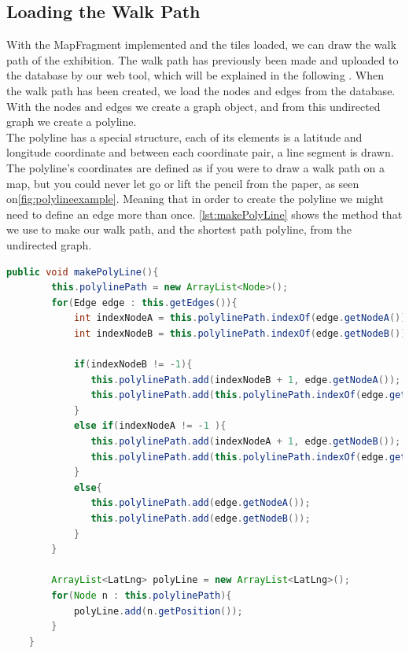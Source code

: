 \subsection*{Loading the Walk Path}
With the MapFragment implemented and the tiles loaded, we can draw the walk path of the exhibition. The walk path has previously been made and uploaded to the database by our web tool, which will be explained in the following . When the walk path has been created, we load the nodes and edges from the database. With the nodes and edges we create a graph object, and from this undirected graph we create a polyline.\\ 
The polyline has a special structure, each of its elements is a latitude and longitude coordinate and between each coordinate pair, a line segment is drawn. The polyline's coordinates are defined as if you were to draw a walk path on a map, but you could never let go or lift the pencil from the paper, as seen on\autoref{fig:polylineexample}. Meaning that in order to create the polyline we might need to define an edge more than once. \autoref{lst:makePolyLine} shows the method that we use to make our walk path, and the shortest path polyline, from the undirected graph.
\begin{lstlisting}[language=java, label=lst:makePolyLine, caption=makePolyLine]
public void makePolyLine(){
        this.polylinePath = new ArrayList<Node>();
        for(Edge edge : this.getEdges()){
            int indexNodeA = this.polylinePath.indexOf(edge.getNodeA());
            int indexNodeB = this.polylinePath.indexOf(edge.getNodeB());
            
            if(indexNodeB != -1){
               this.polylinePath.add(indexNodeB + 1, edge.getNodeA());
               this.polylinePath.add(this.polylinePath.indexOf(edge.getNodeA())+1, edge.getNodeB());
            }
            else if(indexNodeA != -1 ){
               this.polylinePath.add(indexNodeA + 1, edge.getNodeB());
               this.polylinePath.add(this.polylinePath.indexOf(edge.getNodeB())+1, edge.getNodeA());
            }
            else{
               this.polylinePath.add(edge.getNodeA());
               this.polylinePath.add(edge.getNodeB());
            }
        }

        ArrayList<LatLng> polyLine = new ArrayList<LatLng>();
        for(Node n : this.polylinePath){
            polyLine.add(n.getPosition());
        }
    }
\end{lstlisting}
